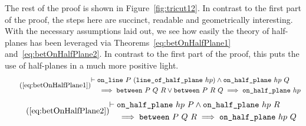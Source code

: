 The rest of the proof is shown in Figure~\ref{fig:tricut12}. In contrast to the first part of the proof, the steps here are succinct, readable and geometrically interesting. With the necessary assumptions laid out, we see how easily the theory of half-planes has been leveraged via Theorems~\ref{eq:betOnHalfPlane1} and~\ref{eq:betOnHalfPlane2}. In contrast to the first part of the proof, this puts the use of half-planes in a much more positive light.
\begin{equation*}
\tag{\ref{eq:betOnHalfPlane1}}
  \begin{split}
    \vdash\;&\code{on\_line}\ P\ (\code{line\_of\_half\_plane}\ hp) \wedge \code{on\_half\_plane}\ hp\ Q\\
    &\implies \between{P}{Q}{R} \vee \between{P}{R}{Q} \implies \code{on\_half\_plane}\ hp
  \end{split}
\end{equation*}
\begin{equation*}\tag{\ref{eq:betOnHalfPlane2}}
\begin{split}
    \vdash\;&\code{on\_half\_plane}\ hp\ P \wedge \code{on\_half\_plane}\ hp\ R\\
    &\implies \between{P}{Q}{R} \implies \code{on\_half\_plane}\ hp\ Q
  \end{split}
\end{equation*}

